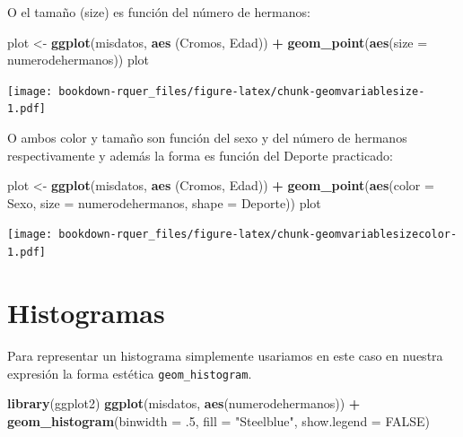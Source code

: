 \documentclass[]{book}
\newenvironment{Shaded}{\begin{snugshade}}{\end{snugshade}}
\newcommand{\DataTypeTok}[1]{\textcolor[rgb]{0.13,0.29,0.53}{#1}}
\newcommand{\FloatTok}[1]{\textcolor[rgb]{0.00,0.00,0.81}{#1}}
\newcommand{\KeywordTok}[1]{\textcolor[rgb]{0.13,0.29,0.53}{\textbf{#1}}}
\newcommand{\NormalTok}[1]{#1}
\newcommand{\OperatorTok}[1]{\textcolor[rgb]{0.81,0.36,0.00}{\textbf{#1}}}
\newcommand{\OtherTok}[1]{\textcolor[rgb]{0.56,0.35,0.01}{#1}}
\newcommand{\StringTok}[1]{\textcolor[rgb]{0.31,0.60,0.02}{#1}}
\theoremstyle{definition}
\theoremstyle{definition}
\theoremstyle{definition}
\theoremstyle{remark}
\begin{document}
O el tamaño (size) es función del número de hermanos:

\begin{Shaded}
\begin{Highlighting}[]
\NormalTok{plot <-}\StringTok{ }\KeywordTok{ggplot}\NormalTok{(misdatos, }\KeywordTok{aes}\NormalTok{ (Cromos, Edad)) }\OperatorTok{+}\StringTok{ }\KeywordTok{geom_point}\NormalTok{(}\KeywordTok{aes}\NormalTok{(}\DataTypeTok{size =}\NormalTok{ numerodehermanos))}
\NormalTok{plot}
\end{Highlighting}
\end{Shaded}

\texttt{[image: bookdown-rquer\_files/figure-latex/chunk-geomvariablesize-1.pdf]}

O ambos color y tamaño son función del sexo y del número de hermanos
respectivamente y además la forma es función del Deporte practicado:

\begin{Shaded}
\begin{Highlighting}[]
\NormalTok{plot <-}\StringTok{ }\KeywordTok{ggplot}\NormalTok{(misdatos, }\KeywordTok{aes}\NormalTok{ (Cromos, Edad)) }\OperatorTok{+}\StringTok{ }\KeywordTok{geom_point}\NormalTok{(}\KeywordTok{aes}\NormalTok{(}\DataTypeTok{color =}\NormalTok{ Sexo, }\DataTypeTok{size =}\NormalTok{ numerodehermanos, }\DataTypeTok{shape =}\NormalTok{ Deporte))}
\NormalTok{plot}
\end{Highlighting}
\end{Shaded}

\texttt{[image: bookdown-rquer\_files/figure-latex/chunk-geomvariablesizecolor-1.pdf]}

\hypertarget{histogramas}{%
\section{Histogramas}\label{histogramas}}

Para representar un histograma simplemente usariamos en este caso en
nuestra expresión la forma estética \texttt{geom\_histogram}.

\begin{Shaded}
\begin{Highlighting}[]
\KeywordTok{library}\NormalTok{(ggplot2)}
\KeywordTok{ggplot}\NormalTok{(misdatos, }\KeywordTok{aes}\NormalTok{(numerodehermanos)) }\OperatorTok{+}
\StringTok{  }\KeywordTok{geom_histogram}\NormalTok{(}\DataTypeTok{binwidth =} \FloatTok{.5}\NormalTok{, }\DataTypeTok{fill =} \StringTok{"Steelblue"}\NormalTok{, }\DataTypeTok{show.legend =} \OtherTok{FALSE}\NormalTok{)}
\end{Highlighting}
\end{Shaded}
\end{document}
